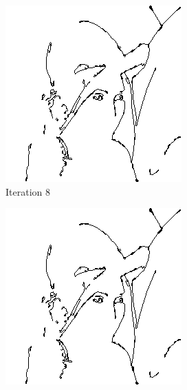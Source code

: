 \documentclass{llncs}
\begin{document}
\begin{figure}
        \begin{subfigure}[b]{0.3\textwidth}
                \includegraphics[width=\textwidth]{IMG/HeuristicInit/Iteration8}
                \caption{Iteration 8}
                \label{fig:heu_iter8}
        \end{subfigure}
        \quad
        \begin{subfigure}[b]{0.3\textwidth}
                \includegraphics[width=\textwidth]{IMG/HeuristicInit/Iteration9}

\end{subfigure}
\end{figure}
\end{document}
